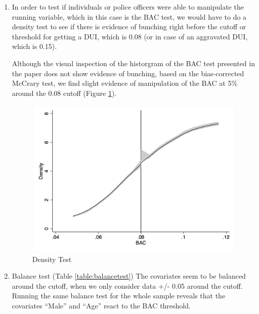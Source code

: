 \documentclass[11pt]{article}\usepackage[]{graphicx}\usepackage[]{color}
\begin{document}
\begin{enumerate}
 
 \item In order to test if individuals or police officers were able to manipulate the running variable, which in this case is the BAC test, we would have to do a density test to see if there is evidence of bunching right before the cutoff or threshold for getting a DUI, which is 0.08  (or in case of an aggravated DUI, which is 0.15).
 
Although the visual inspection of the historgram of the BAC test presented in the paper does not show evidence of bunching, based on the bias-corrected McCrary test, we find slight evidence of manipulation of the BAC at 5\% around the 0.08 cutoff (Figure \ref{densitytest}).

 
 \begin{figure}[!htb]
 \centering
  \includegraphics[scale=0.6]{figure1}
\caption{Density Test}
\label{densitytest}
 \end{figure}
 
\item Balance test (Table \ref{table:balancetest})
\newline
The covariates seem to be balanced around the cutoff, when we only consider data +/- 0.05 around the cutoff. Running the same balance test for the whole sample reveals that the covariates ``Male'' and ``Age'' react to the BAC threshold.


\end{enumerate}
\end{document}
